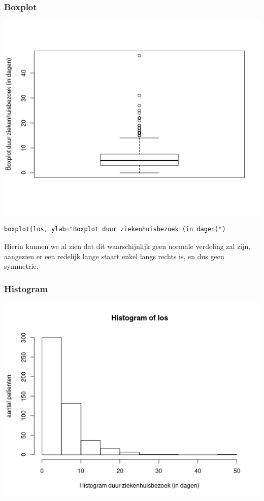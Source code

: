\documentclass{article}
\begin{document}
\subsubsection{Boxplot}
\begin{center}
    \includegraphics[scale=0.5]{output/boxplot-los.png}
\end{center}
\begin{verbatim}
boxplot(los, ylab="Boxplot duur ziekenhuisbezoek (in dagen)")
\end{verbatim}
Hierin kunnen we al zien dat dit waarschijnlijk geen normale verdeling zal zijn, aangezien er een redelijk lange staart enkel langs rechts is, en dus geen symmetrie.
\subsubsection{Histogram}
\begin{center}
    \includegraphics[scale=0.5]{output/Histogram-los.png}
\end{center}
\end{document}
